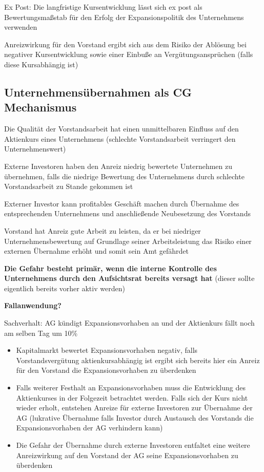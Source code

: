 \documentclass[
]{article}
\providecommand{\tightlist}{%
  \setlength{\itemsep}{0pt}\setlength{\parskip}{0pt}}
\begin{document}
Ex Post: Die langfristige Kursentwicklung lässt sich ex post als
Bewertungsmaßstab für den Erfolg der Expansionspolitik des Unternehmens
verwenden

Anreizwirkung für den Vorstand ergibt sich aus dem Risiko der Ablösung
bei negativer Kursentwicklung sowie einer Einbuße an
Vergütungsansprüchen (falls diese Kursabhängig ist)

\hypertarget{unternehmensuxfcbernahmen-als-cg-mechanismus}{%
\subsection{Unternehmensübernahmen als CG
Mechanismus}\label{unternehmensuxfcbernahmen-als-cg-mechanismus}}

Die Qualität der Vorstandsarbeit hat einen unmittelbaren Einfluss auf
den Aktienkurs eines Unternehmens (schlechte Vorstandsarbeit verringert
den Unternehmenswert)

Externe Investoren haben den Anreiz niedrig bewertete Unternehmen zu
übernehmen, falls die niedrige Bewertung des Unternehmens durch
schlechte Vorstandsarbeit zu Stande gekommen ist

Externer Investor kann profitables Geschäft machen durch Übernahme des
entsprechenden Unternehmens und anschließende Neubesetzung des Vorstands

Vorstand hat Anreiz gute Arbeit zu leisten, da er bei niedriger
Unternehmensbewertung auf Grundlage seiner Arbeitsleistung das Risiko
einer externen Übernahme erhöht und somit sein Amt gefährdet

\textbf{Die Gefahr besteht primär, wenn die interne Kontrolle des
Unternehmens durch den Aufsichtsrat bereits versagt hat }(dieser sollte
eigentlich bereits vorher aktiv werden)

\textbf{Fallanwendung?}

Sachverhalt: AG kündigt Expansionsvorhaben an und der Aktienkurs fällt
noch am selben Tag um 10\%

\begin{itemize}
\tightlist
\item
  Kapitalmarkt bewertet Expansionsvorhaben negativ, falls
  Vorstandsvergütung aktienkursabhängig ist ergibt sich bereits hier ein
  Anreiz für den Vorstand die Expansionsvorhaben zu überdenken
\item
  Falls weiterer Festhalt an Expansionsvorhaben muss die Entwicklung des
  Aktienkurses in der Folgezeit betrachtet werden. Falls sich der Kurs
  nicht wieder erholt, entstehen Anreize für externe Investoren zur
  Übernahme der AG (lukrative Übernahme falls Investor durch Austausch
  des Vorstands die Expansionsvorhaben der AG verhindern kann)
\item
  Die Gefahr der Übernahme durch externe Investoren entfaltet eine
  weitere Anreizwirkung auf den Vorstand der AG seine Expansionsvorhaben
  zu überdenken
\end{itemize}
\end{document}
